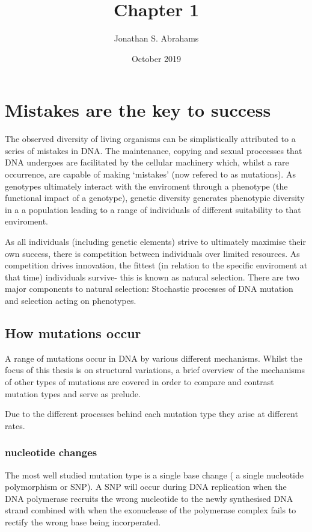 \documentclass{article}
\title{Chapter 1}
\author{Jonathan S. Abrahams }
\date{October 2019}
\begin{document}
\maketitle



\section{Mistakes are the key to success}
The observed diversity of living organisms can be simplistically attributed to a series of mistakes in DNA.  The maintenance, copying and sexual proccesses that DNA undergoes are facilitated by the cellular machinery which, whilst a rare occurrence, are capable of making `mistakes' (now refered to as mutations). As genotypes ultimately interact with the enviroment through a phenotype (the functional impact of a genotype), genetic diversity generates phenotypic diversity in a a population leading to a range of individuals of different suitability to that enviroment.

As all individuals (including genetic elements) strive to ultimately maximise their own success, there is competition between individuals over limited resources.  As competition drives innovation, the fittest (in relation to the specific enviroment at that time) individuals survive- this is known as natural selection. There are two major components to natural selection: Stochastic processes of DNA mutation and  selection acting on phenotypes.





\subsection{How mutations occur}
A range of mutations occur in DNA  by various different mechanisms. Whilst the focus of this thesis is on structural variations, a brief overview of the mechanisms of other types of mutations are covered in order to compare and contrast mutation types and serve as prelude.

Due to the different processes behind each mutation type they arise at different rates.


\subsubsection{nucleotide changes}
The most well studied mutation type is a single base change ( a single nucleotide polymorphism or SNP). A SNP will occur during DNA replication when the DNA polymerase recruits the wrong nucleotide to the newly synthesised DNA strand combined with when the exonuclease of the polymerase complex fails to rectify the wrong base being incorperated.
 
\end{document}
